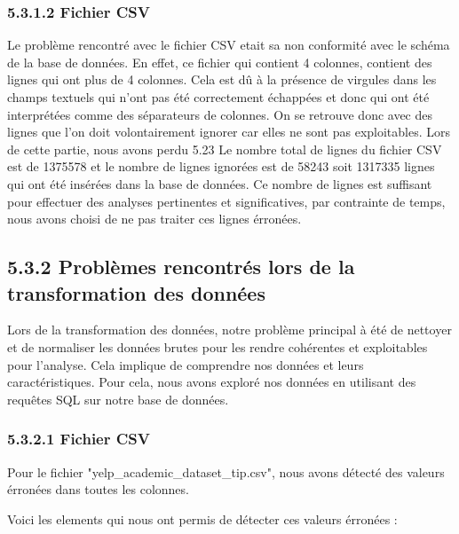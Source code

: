 \subsubsection{5.3.1.2 Fichier CSV}

Le problème rencontré avec le fichier CSV etait sa non conformité avec le schéma de la base de données.
En effet, ce fichier qui contient 4 colonnes, contient des lignes qui ont plus de 4 colonnes.
Cela est dû à la présence de virgules dans les champs textuels qui n'ont pas été correctement échappées et donc qui ont été interprétées comme des séparateurs de colonnes.
On se retrouve donc avec des lignes que l'on doit volontairement ignorer car elles ne sont pas exploitables.
Lors de cette partie, nous avons perdu 5.23%
Le nombre total de lignes du fichier CSV est de 1375578 et le nombre de lignes ignorées est de 58243 soit 1317335 lignes qui ont été insérées dans la base de données.
Ce nombre de lignes est suffisant pour effectuer des analyses pertinentes et significatives, par contrainte de temps, nous avons choisi de ne pas traiter ces lignes érronées.


\subsection{5.3.2 Problèmes rencontrés lors de la transformation des données}

Lors de la transformation des données, notre problème principal à été de nettoyer et de normaliser les données brutes pour les rendre cohérentes et exploitables pour l’analyse.
Cela implique de comprendre nos données et leurs caractéristiques.
Pour cela, nous avons exploré nos données en utilisant des requêtes SQL sur notre base de données.

\subsubsection{5.3.2.1 Fichier CSV}

Pour le fichier "yelp_academic_dataset_tip.csv", nous avons détecté des valeurs érronées dans toutes les colonnes.

Voici les elements qui nous ont permis de détecter ces valeurs érronées :

